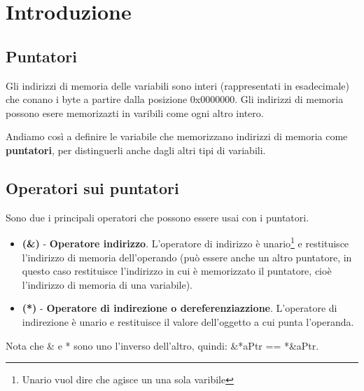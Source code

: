 \section{Introduzione}
\subsection{Puntatori}
Gli indirizzi di memoria delle variabili sono interi (rappresentati in esadecimale) che conano i byte a partire dalla posizione 0x0000000. Gli indirizzi di memoria possono esere memorizazti in varibili come ogni altro intero.
\begin{definition}[Puntatori]
Andiamo così a definire le variabile che memorizzano indirizzi di memoria come \textbf{puntatori}, per distinguerli anche dagli altri tipi di variabili.
\end{definition}
\subsection{Operatori sui puntatori}
Sono due i principali operatori che possono essere usai con i puntatori.
\begin{itemize}
    \item \textbf{(\&)} \hspace{.1cm} - \hspace{.1cm} \textbf{Operatore indirizzo}. L'operatore di indirizzo è unario\footnote{Unario vuol dire che agisce un una sola varibile} e restituisce l'indirizzo di memoria dell'operando (può essere anche un altro puntatore, in questo caso restituisce l'indirizzo in cui è memorizzato il puntatore, cioè l'indirizzo di memoria di una variabile).
    \item \textbf{(*)} \hspace{.1cm} - \hspace{.1cm} \textbf{Operatore di indirezione o dereferenziazzione}. L'operatore di indirezione è unario e restituisce il valore dell'oggetto a cui punta l'operanda. 
\end{itemize}

\begin{note}
Nota che \& e * sono uno l'inverso dell'altro, quindi: \&*aPtr == *\&aPtr.
\end{note}

